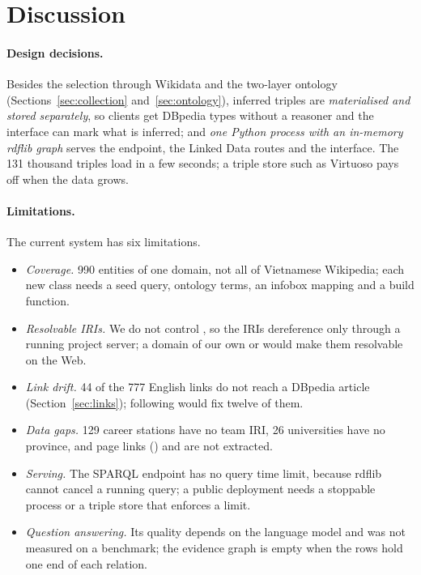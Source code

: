 \section{Discussion}
\label{sec:discussion}

\paragraph{Design decisions.} Besides the selection through Wikidata and the
two-layer ontology (Sections~\ref{sec:collection} and~\ref{sec:ontology}),
inferred triples are \emph{materialised and stored separately}, so clients get
DBpedia types without a reasoner and the interface can mark what is inferred;
and \emph{one Python process with an in-memory rdflib graph} serves the
endpoint, the Linked Data routes and the interface. The 131 thousand triples
load in a few seconds; a triple store such as Virtuoso pays off when the data
grows.

\paragraph{Limitations.} The current system has six limitations.
\begin{itemize}
  \item \emph{Coverage.} 990 entities of one domain, not all of Vietnamese
        Wikipedia; each new class needs a seed query, ontology terms, an
        infobox mapping and a build function.
  \item \emph{Resolvable IRIs.} We do not control , so
        the IRIs dereference only through a running project server; a domain
        of our own or  would make them resolvable on the Web.
  \item \emph{Link drift.} 44 of the 777 English links do not reach a DBpedia
        article (Section~\ref{sec:links}); following
         would fix twelve of them.
  \item \emph{Data gaps.} 129 career stations have no team IRI, 26
        universities have no province, and page links
        () and  are not extracted.
  \item \emph{Serving.} The SPARQL endpoint has no query time limit, because
        rdflib cannot cancel a running query; a public deployment needs a
        stoppable process or a triple store that enforces a limit.
  \item \emph{Question answering.} Its quality depends on the language
        model and was not measured on a benchmark; the evidence graph is
        empty when the rows hold one end of each relation.
\end{itemize}
